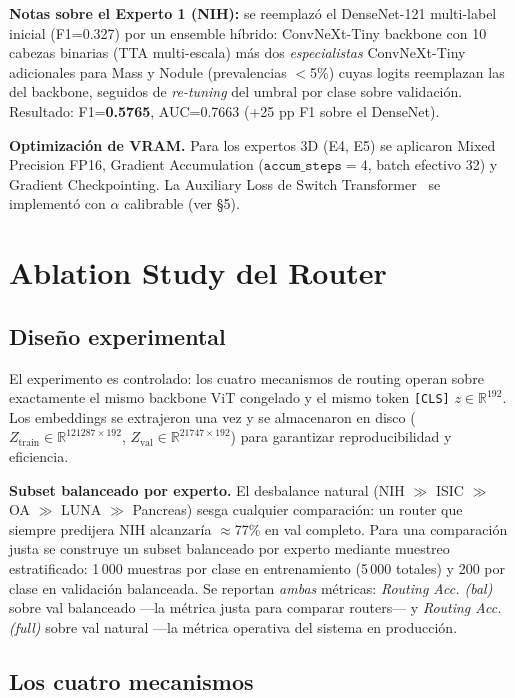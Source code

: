 \documentclass[11pt, a4paper]{article}
\begin{document}
\textbf{Notas sobre el Experto 1 (NIH):} se reemplazó el DenseNet-121
multi-label inicial (F1=0.327) por un ensemble híbrido: ConvNeXt-Tiny
backbone con 10 cabezas binarias (TTA multi-escala) más dos
\textit{especialistas} ConvNeXt-Tiny adicionales para Mass y Nodule
(prevalencias $<$5\%) cuyas logits reemplazan las del backbone,
seguidos de \textit{re-tuning} del umbral por clase sobre validación.
Resultado: F1=\textbf{0.5765}, AUC=0.7663 (+25 pp F1 sobre el DenseNet).

\textbf{Optimización de VRAM.} Para los expertos 3D (E4, E5) se aplicaron
Mixed Precision FP16, Gradient Accumulation ($\texttt{accum\_steps}{=}4$,
batch efectivo 32) y Gradient Checkpointing. La Auxiliary Loss de Switch
Transformer~\cite{fedus2021switch} se implementó con $\alpha$ calibrable
(ver §5).

\section{Ablation Study del Router}

\subsection{Diseño experimental}

El experimento es controlado: los cuatro mecanismos de routing operan sobre
exactamente el mismo backbone ViT congelado y el mismo token \texttt{[CLS]}
$z \in \mathbb{R}^{192}$. Los embeddings se extrajeron una vez y se
almacenaron en disco ($Z_{\text{train}} \in \mathbb{R}^{121287 \times 192}$,
$Z_{\text{val}} \in \mathbb{R}^{21747 \times 192}$) para garantizar
reproducibilidad y eficiencia.

\textbf{Subset balanceado por experto.} El desbalance natural
(NIH $\gg$ ISIC $\gg$ OA $\gg$ LUNA $\gg$ Pancreas) sesga cualquier
comparación: un router que siempre predijera NIH alcanzaría $\approx$77\%
en val completo. Para una comparación justa se construye un subset
balanceado por experto mediante muestreo estratificado: 1\,000 muestras
por clase en entrenamiento (5\,000 totales) y 200 por clase en validación
balanceada. Se reportan \textit{ambas} métricas: \textit{Routing Acc.
(bal)} sobre val balanceado —la métrica justa para comparar routers— y
\textit{Routing Acc. (full)} sobre val natural —la métrica operativa del
sistema en producción.

\subsection{Los cuatro mecanismos}
\end{document}
